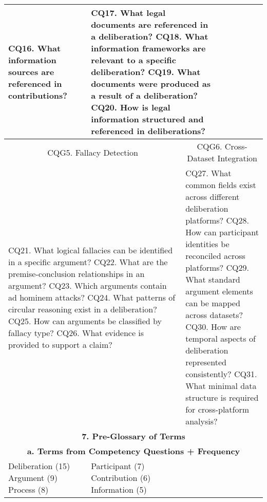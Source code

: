 \documentclass[11pt,a4paper]{article}
\begin{document}
\begin{table}[ht]
\begin{tabular}{|l|l|l|l|l|l|l|l|}
{CQ16. What information sources are referenced in contributions?
} &
\multicolumn{4}{p{6.8cm}|}{
CQ17. What legal documents are referenced in a deliberation?\newline
CQ18. What information frameworks are relevant to a specific deliberation?\newline
CQ19. What documents were produced as a result of a deliberation?\newline
CQ20. How is legal information structured and referenced in deliberations?
} \\
\hline
\multicolumn{4}{|c|}{CQG5. Fallacy Detection} & \multicolumn{4}{c|}{CQG6. Cross-Dataset Integration} \\
\hline
\multicolumn{4}{|p{6.8cm}|}{
CQ21. What logical fallacies can be identified in a specific argument?\newline
CQ22. What are the premise-conclusion relationships in an argument?\newline
CQ23. Which arguments contain ad hominem attacks?\newline
CQ24. What patterns of circular reasoning exist in a deliberation?\newline
CQ25. How can arguments be classified by fallacy type?\newline
CQ26. What evidence is provided to support a claim?
} &
\multicolumn{4}{p{6.8cm}|}{
CQ27. What common fields exist across different deliberation platforms?\newline
CQ28. How can participant identities be reconciled across platforms?\newline
CQ29. What standard argument elements can be mapped across datasets?\newline
CQ30. How are temporal aspects of deliberation represented consistently?\newline
CQ31. What minimal data structure is required for cross-platform analysis?
} \\
\hline
\multicolumn{8}{|c|}{\textbf{7. Pre-Glossary of Terms}} \\
\hline
\multicolumn{8}{|c|}{\textbf{a. Terms from Competency Questions + Frequency}} \\
\hline
\multicolumn{1}{|p{3.15cm}|}{
Deliberation (15)\newline
Argument (9)\newline
Process (8)
} &
\multicolumn{1}{p{3.15cm}|}{
Participant (7)\newline
Contribution (6)\newline
Information (5)
} &
\multicolumn{1}{p{3.15cm}|}{
}
\end{tabular}
\end{table}
\end{document}
